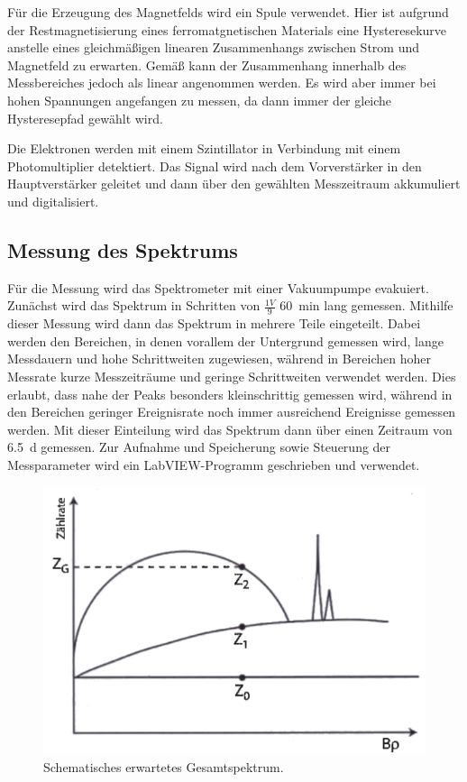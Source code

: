 \documentclass[
	a4paper,
	12pt,
	pagesize,
	ngerman
]{scrartcl}
\begin{document}
	Für die Erzeugung des Magnetfelds wird ein Spule verwendet.
	Hier ist aufgrund der Restmagnetisierung eines ferromatgnetischen Materials eine Hysteresekurve anstelle eines gleichmäßigen linearen Zusammenhangs zwischen Strom und Magnetfeld zu erwarten. %
	Gemäß \cite{Anleitung} kann der Zusammenhang innerhalb des Messbereiches jedoch als linear angenommen werden.
	Es wird aber immer bei hohen Spannungen angefangen zu messen, da dann immer der gleiche Hysteresepfad gewählt wird.

	Die Elektronen werden mit einem Szintillator in Verbindung mit einem Photomultiplier detektiert.
	Das Signal wird nach dem Vorverstärker in den Hauptverstärker geleitet und dann über den gewählten Messzeitraum akkumuliert und digitalisiert.

	\subsection{Messung des Spektrums}

	Für die Messung wird das Spektrometer mit einer Vakuumpumpe evakuiert.
	Zunächst wird das Spektrum in Schritten von $\frac{1 \si{V}}{9}$  \SI{60}{\minute} lang gemessen. %
	Mithilfe dieser Messung wird dann das Spektrum in mehrere Teile eingeteilt.
	Dabei werden den Bereichen, in denen vorallem der Untergrund gemessen wird, lange Messdauern und hohe Schrittweiten zugewiesen, während in Bereichen hoher Messrate kurze Messzeiträume und geringe Schrittweiten verwendet werden.
	Dies erlaubt, dass nahe der Peaks besonders kleinschrittig gemessen wird, während in den Bereichen geringer Ereignisrate noch immer ausreichend Ereignisse gemessen werden.
	Mit dieser Einteilung wird das Spektrum dann über einen Zeitraum von \SI{6,5}{\day} gemessen.
	Zur Aufnahme und Speicherung sowie Steuerung der Messparameter wird ein LabVIEW-Programm geschrieben und verwendet.

	\begin{figure}[H]
			\includegraphics[width= 0.6 \linewidth]{img/Schema_Spektrum}
			\caption{
			Schematisches erwartetes Gesamtspektrum.
			\cite{Anleitung}
			}
			\label{fig_Schema_Spektrum}
	\end{figure}
\end{document}
